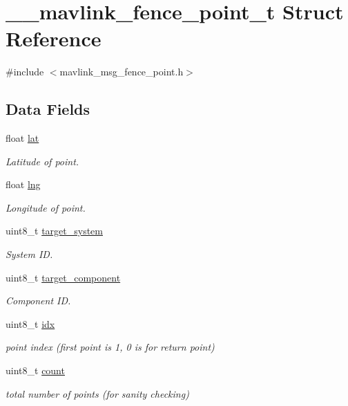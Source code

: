 \hypertarget{struct____mavlink__fence__point__t}{\section{\+\_\+\+\_\+mavlink\+\_\+fence\+\_\+point\+\_\+t Struct Reference}
\label{struct____mavlink__fence__point__t}
}


{\ttfamily \#include $<$mavlink\+\_\+msg\+\_\+fence\+\_\+point.\+h$>$}

\subsection*{Data Fields}
\begin{DoxyCompactItemize}
\item 
float \hyperlink{struct____mavlink__fence__point__t_afc9afaf3ccbc8f1caee31a090dbec1e8}{lat}
\begin{DoxyCompactList}\small\item\em Latitude of point. \end{DoxyCompactList}\item 
float \hyperlink{struct____mavlink__fence__point__t_aa050c80f5abc951146c1907038053d5c}{lng}
\begin{DoxyCompactList}\small\item\em Longitude of point. \end{DoxyCompactList}\item 
uint8\+\_\+t \hyperlink{struct____mavlink__fence__point__t_ad1c253d1f52085a61e2b71dfb9b749b8}{target\+\_\+system}
\begin{DoxyCompactList}\small\item\em System I\+D. \end{DoxyCompactList}\item 
uint8\+\_\+t \hyperlink{struct____mavlink__fence__point__t_a3f2fd91d8df704f86007974aa842f9db}{target\+\_\+component}
\begin{DoxyCompactList}\small\item\em Component I\+D. \end{DoxyCompactList}\item 
uint8\+\_\+t \hyperlink{struct____mavlink__fence__point__t_adee07e538f3ac71bfca7be36b0bf6285}{idx}
\begin{DoxyCompactList}\small\item\em point index (first point is 1, 0 is for return point) \end{DoxyCompactList}\item 
uint8\+\_\+t \hyperlink{struct____mavlink__fence__point__t_a48a53b209ef44b806ec995eadd154e86}{count}
\begin{DoxyCompactList}\small\item\em total number of points (for sanity checking) \end{DoxyCompactList}\end{DoxyCompactItemize}


